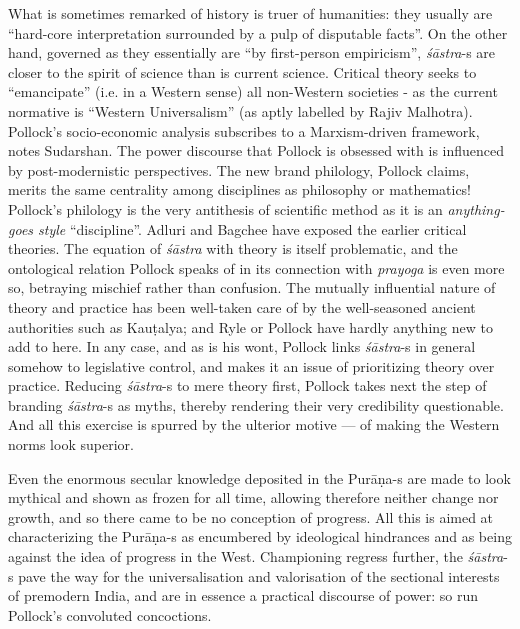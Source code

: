 What is sometimes remarked of history is truer of humanities: they usually are “hard-core interpretation surrounded by a pulp of disputable facts”. On the other hand, governed as they essentially are “by first-person empiricism”, {\sl śāstra}-s are closer to the spirit of science than is current science. Critical theory seeks to “emancipate” (i.e. in a Western sense) all non-Western societies - as the current normative is “Western Universalism” (as aptly labelled by Rajiv Malhotra). Pollock’s socio-economic analysis subscribes to a Marxism-driven framework, notes Sudarshan. The power discourse that Pollock is obsessed with is influenced by post-modernistic perspectives. The new brand philology, Pollock claims, merits the same centrality among disciplines as philosophy or mathematics! Pollock’s philology is the very antithesis of scientific method as it is an {\sl anything-goes style} “discipline”. Adluri and Bagchee have exposed the earlier critical theories. The equation of {\sl śāstra} with theory is itself problematic, and the ontological relation Pollock speaks of in its connection with {\sl prayoga} is even more so, betraying mischief rather than confusion. The mutually influential nature of theory and practice has been well-taken care of by the well-seasoned ancient authorities such as Kauṭalya; and Ryle or Pollock have hardly anything new to add to here. In any case, and as is his wont, Pollock links {\sl śāstra}-s in general somehow to legislative control, and makes it an issue of prioritizing theory over practice. Reducing {\sl śāstra}-s to mere theory first, Pollock takes next the step of branding {\sl śāstra}-s as myths, thereby rendering their very credibility questionable. And all this exercise is spurred by the ulterior motive --- of making the Western norms look superior.

Even the enormous secular knowledge deposited in the Purāṇa-s are made to look mythical and shown as frozen for all time, allowing therefore neither change nor growth, and so there came to be no conception of progress. All this is aimed at characterizing the \hbox{Purāṇa-s} as encumbered by ideological hindrances and as being against the idea of progress in the West. Championing regress further, the {\sl śāstra}-s pave the way for the universalisation and valorisation of the sectional interests of premodern India, and are in essence a practical discourse of power: so run Pollock’s convoluted concoctions.

